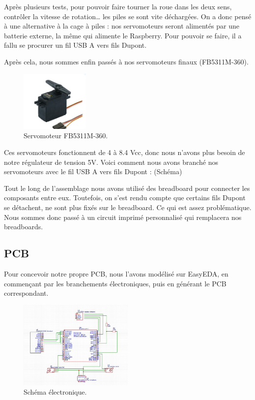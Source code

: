 \documentclass[a4paper,12pt]{report}  %
\begin{document}
Après plusieurs tests, pour pouvoir faire tourner la roue dans les deux sens, contrôler la vitesse de rotation… les piles se sont vite déchargées. On a donc pensé à une alternative à la cage à piles : nos servomoteurs seront alimentés par une batterie externe, la même qui alimente le Raspberry. Pour pouvoir se faire, il a fallu se procurer un fil USB A vers fils Dupont.

Après cela, nous sommes enfin passés à nos servomoteurs finaux (FB5311M-360). \\

\begin{figure}[H]
	\centering
	\includegraphics[width=0.3\textwidth]{./attachments/moteur_servo.jpg}
	\caption{Servomoteur FB5311M-360.}
\end{figure}

Ces servomoteurs fonctionnent de 4 à 8.4 Vcc, donc nous n’avons plus besoin de notre régulateur de tension 5V. Voici comment nous avons branché nos servomoteurs avec le fil USB A vers fils Dupont : 
(Schéma)

Tout le long de l’assemblage nous avons utilisé des breadboard pour connecter les composants entre eux. Toutefois, on s’est rendu compte que certains fils Dupont se détachent, ne sont plus fixés sur le breadboard. Ce qui est assez problématique. 
Nous sommes donc passé à un circuit imprimé personnalisé qui remplacera nos breadboards.

\subsection{PCB}

Pour concevoir notre propre PCB, nous l’avons modélisé sur EasyEDA, en commençant par les branchements électroniques, puis en générant le PCB correspondant. 

\begin{figure}[H]
	\centering
	\includegraphics[width=0.5\textwidth]{./attachments/schema_elec.jpg}
	\caption{Schéma électronique.}
\end{figure}
\end{document}
